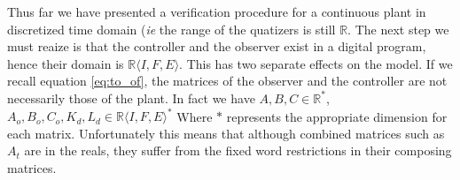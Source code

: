 \documentclass[twocolumn]{autart}    %
\newcommand{\mat}[1]{{#1}}
\begin{document}
{Thus far we have presented a verification procedure for a continuous plant
in discretized time domain (\emph{ie} the range of the quatizers is still
$\mathbb{R}$.  The next step we must reaize is that the controller and the
observer exist in a digital program, hence their domain is
$\mathbb{R}\langle I,F,E\rangle$.  This has two separate effects on the
model.  If we recall equation \eqref{eq:to_of}, the matrices of the observer
and the controller are not necessarily those of the plant.  In fact we have
$\mat{A},\mat{B},\mat{C} \in \mathbb{R}^*$, $\mat{A}_o,\mat{B}_o,\mat{C}_o,
\mat{K}_d, \mat{L}_d \in \mathbb{R}\langle I,F,E\rangle^*$ Where $*$
represents the appropriate dimension for each matrix.  Unfortunately this
means that although combined matrices such as $\mat{A}_t$ are in the reals,
they suffer from the fixed word restrictions in their composing matrices.

}
\end{document}
